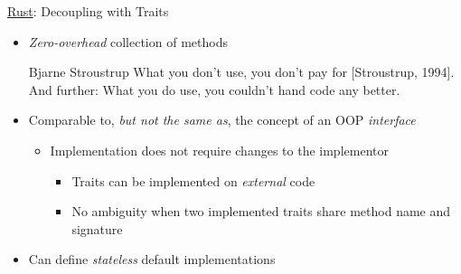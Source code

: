 \begin{frame}[fragile]{\underline{Rust}: Decoupling with Traits \hfill {\footnotesize \currentname}}


    \begin{itemize}

        \item \textit{Zero-overhead} collection of methods\\[3pt]
            { \footnotesize
            \begin{aquote}{\footnotesize Bjarne Stroustrup}
                What you don't use, you don't pay for [Stroustrup, 1994]. And further: What you do use, you couldn't hand code any better.
            \end{aquote} }

        \item Comparable to, \textit{but not the same as}, the concept of an OOP \textit{interface}\\
            \begin{itemize}
                \item Implementation does not require changes to the implementor
                \begin{itemize}
                    \item Traits can be implemented on \textit{external} code
                    \item No ambiguity when two implemented traits share method name and signature
                \end{itemize}
            \end{itemize}

        \item Can define \textit{stateless} default implementations\\

    \end{itemize}

    \vfill

\end{frame}

